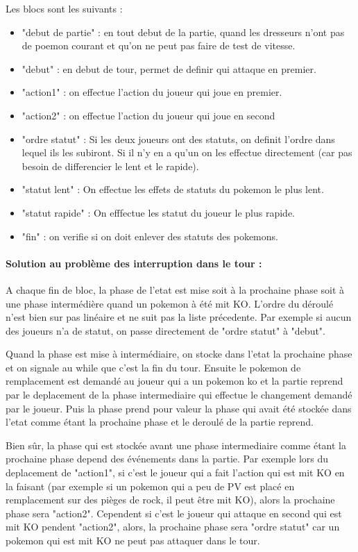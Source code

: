             Les blocs sont les suivants :
            \begin{itemize}
                \item "debut de partie" : en tout debut de la partie, quand les dresseurs n'ont pas de poemon courant et qu'on ne peut pas faire de test de vitesse.
                \item "debut" : en debut de tour, permet de definir qui attaque en premier.
                \item "action1" : on effectue l'action du joueur qui joue en premier. 
                \item "action2" : on effectue l'action du joueur qui joue en second
                \item "ordre statut" : Si les deux joueurs ont des statuts, on definit l'ordre dans lequel ils les subiront. Si il n'y en a qu'un on les effectue directement (car pas besoin de differencier le lent et le rapide).
                \item "statut lent" : On effectue les effets de statuts du pokemon le plus lent.
                \item "statut rapide" : On efffectue les statut du joueur le plus rapide.
                \item "fin" : on verifie si on doit enlever des statuts des pokemons.
            \end{itemize}
            \paragraph{Solution au problème des interruption dans le tour :}
                A chaque fin de bloc, la phase de l'etat est mise soit à la prochaine phase soit à une phase intermédière quand un pokemon à été mit KO. L'ordre du déroulé n'est bien sur pas linéaire et ne suit pas la liste précedente. Par exemple si aucun des joueurs n'a de statut, on passe directement de "ordre statut" à "debut".
                
                Quand la phase est mise à intermédiaire, on stocke dans l'etat la prochaine phase et on signale au while que c'est la fin du tour. Ensuite le pokemon de remplacement est demandé au joueur qui a un pokemon ko et la partie reprend par le deplacement de la phase intermediaire qui effectue le changement demandé par le joueur. Puis la phase prend pour valeur la phase qui avait été stockée dans l'etat comme étant la prochaine phase et le deroulé de la partie reprend.
                
                Bien sûr, la phase qui est stockée avant une phase intermediaire comme étant la prochaine phase depend des événements dans la partie. Par exemple lors du deplacement de "action1", si c'est le joueur qui a fait l'action qui est mit KO en la faisant (par exemple si un pokemon qui a peu de PV est placé en remplacement sur des pièges de rock, il peut être mit KO), alors la prochaine phase sera "action2". Cependent si c'est le joueur qui attaque en second qui est mit KO pendent "action2", alors, la prochaine phase sera "ordre statut" car un pokemon qui est mit KO ne peut pas attaquer dans le tour.
                
